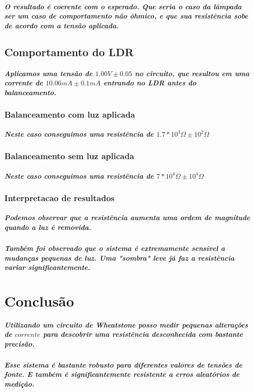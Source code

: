 \documentclass[12pt,twoside, a4paper, twocolumn]{article}
\begin{document}
\subparagraph*{O resultado é coerente com o esperado. Que seria o caso da lâmpada ser um caso de comportamento não ôhmico, e que sua resistência sobe de acordo com a tensão aplicada.}


\subsection{Comportamento do LDR}

\subparagraph*{Aplicamos uma tensão de $1.00V \pm 0.05$ no circuito, que resultou em uma corrente de $10.06mA \pm 0.1mA$ entrando no LDR antes do balanceamento.}

\subsubsection{Balanceamento com luz aplicada}

\subparagraph*{Neste caso conseguimos uma resistência de $1.7*10^{3} \varOmega \pm 10^2 \varOmega$}

\subsubsection{Balanceamento sem luz aplicada}

\subparagraph*{Neste caso conseguimos uma resistência de $7*10^{4} \varOmega \pm 10^4 \varOmega$}

\subsubsection{Interpretacao de resultados}

\subparagraph*{Podemos observar que a resistência aumenta uma ordem de magnitude quando a luz é removida. }

\subparagraph{Também foi observado que o sistema é extremamente sensível a mudanças pequenas de luz. Uma "sombra" leve já faz a resistência variar significantemente.}

\section{Conclusão}

\subparagraph*{Utilizando um circuito de \emph{Wheatstone} posso medir pequenas alterações de $corrente$ para descobrir uma resistência desconhecida com bastante precisão.}

\subparagraph*{Esse sistema é bastante robusto para diferentes valores de tensões de fonte. E também é significantemente resistente a erros aleatórios de medição.}
\end{document}
